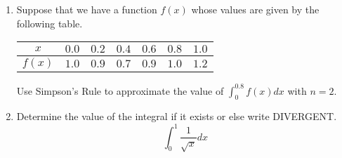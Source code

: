 \documentclass[12pt]{article}
\begin{document}
\begin{enumerate}
\item
Suppose that we have a function $f(x)$ whose values are given by the following table.

\begin{center}
\begin{tabular}{c|c|c|c|c|c|c}
$x$ & $0.0$ & $0.2$ & $0.4$ & $0.6$ & $0.8$ & $1.0$\\\hline
$f(x)$ & $1.0$ & $0.9$ & $0.7$ & $0.9$ & $1.0$ & $1.2$
\end{tabular}
\end{center}

Use Simpson's Rule to approximate the value of $\int_0^{0.8} f(x)dx$ with $n=2$.
\vspace{3in}
\item
Determine the value of the integral if it exists or else write DIVERGENT.
$$\int_0^1 \frac{1}{\sqrt{x}}dx$$
\end{enumerate}
\end{document}
